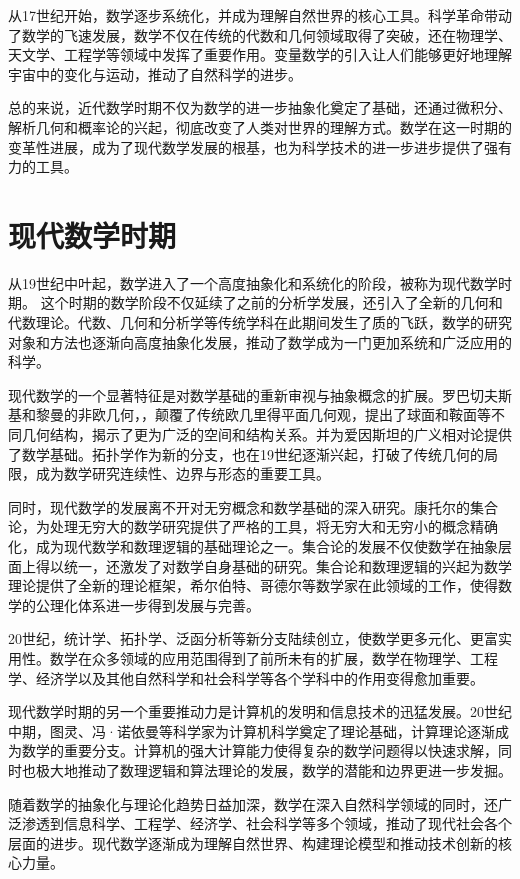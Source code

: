 从17世纪开始，数学逐步系统化，并成为理解自然世界的核心工具。科学革命带动了数学的飞速发展，数学不仅在传统的代数和几何领域取得了突破，还在物理学、天文学、工程学等领域中发挥了重要作用。变量数学的引入让人们能够更好地理解宇宙中的变化与运动，推动了自然科学的进步。

总的来说，近代数学时期不仅为数学的进一步抽象化奠定了基础，还通过微积分、解析几何和概率论的兴起，彻底改变了人类对世界的理解方式。数学在这一时期的变革性进展，成为了现代数学发展的根基，也为科学技术的进一步进步提供了强有力的工具。

\section{现代数学时期}
从19世纪中叶起，数学进入了一个高度抽象化和系统化的阶段，被称为现代数学时期。
这个时期的数学阶段不仅延续了之前的分析学发展，还引入了全新的几何和代数理论。代数、几何和分析学等传统学科在此期间发生了质的飞跃，数学的研究对象和方法也逐渐向高度抽象化发展，推动了数学成为一门更加系统和广泛应用的科学。

现代数学的一个显著特征是对数学基础的重新审视与抽象概念的扩展。罗巴切夫斯基和黎曼的非欧几何，，颠覆了传统欧几里得平面几何观，提出了球面和鞍面等不同几何结构，揭示了更为广泛的空间和结构关系。并为爱因斯坦的广义相对论提供了数学基础。拓扑学作为新的分支，也在19世纪逐渐兴起，打破了传统几何的局限，成为数学研究连续性、边界与形态的重要工具。

同时，现代数学的发展离不开对无穷概念和数学基础的深入研究。康托尔的集合论，为处理无穷大的数学研究提供了严格的工具，将无穷大和无穷小的概念精确化，成为现代数学和数理逻辑的基础理论之一。集合论的发展不仅使数学在抽象层面上得以统一，还激发了对数学自身基础的研究。集合论和数理逻辑的兴起为数学理论提供了全新的理论框架，希尔伯特、哥德尔等数学家在此领域的工作，使得数学的公理化体系进一步得到发展与完善。

20世纪，统计学、拓扑学、泛函分析等新分支陆续创立，使数学更多元化、更富实用性。数学在众多领域的应用范围得到了前所未有的扩展，数学在物理学、工程学、经济学以及其他自然科学和社会科学等各个学科中的作用变得愈加重要。

现代数学时期的另一个重要推动力是计算机的发明和信息技术的迅猛发展。20世纪中期，图灵、冯·诺依曼等科学家为计算机科学奠定了理论基础，计算理论逐渐成为数学的重要分支。计算机的强大计算能力使得复杂的数学问题得以快速求解，同时也极大地推动了数理逻辑和算法理论的发展，数学的潜能和边界更进一步发掘。

随着数学的抽象化与理论化趋势日益加深，数学在深入自然科学领域的同时，还广泛渗透到信息科学、工程学、经济学、社会科学等多个领域，推动了现代社会各个层面的进步。现代数学逐渐成为理解自然世界、构建理论模型和推动技术创新的核心力量。

